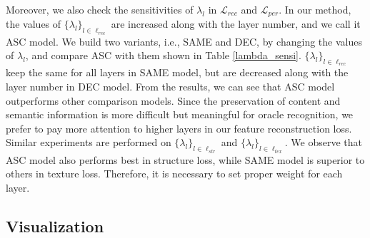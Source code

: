 \documentclass[10pt,journal,compsoc,twocolumn ]{IEEEtran}
\begin{document}
\begin{table}
\small
\renewcommand\arraystretch{1.1}
\caption{The empirical analysis results for the sensitivity of hyperparameter $\lambda_l$}
\label{lambda_sensi}
	\begin{center}
    \small
    \end{center}
\end{table}

Moreover, we also check the sensitivities of $\lambda_l$ in $\mathcal{L}_{rec}$ and $\mathcal{L}_{per}$. In our method, the values of $\{\lambda_l\}_{l\in \ell_{rec}}$ are increased along with the layer number, and we call it ASC model. We build two variants, i.e., SAME and DEC, by changing the values of $\lambda_l$, and compare ASC with them shown in Table \ref{lambda_sensi}. $\{\lambda_l\}_{l\in \ell_{rec}}$ keep the same for all layers in SAME model, but are decreased along with the layer number in DEC model. From the results, we can see that ASC model outperforms other comparison models. Since the preservation of content and semantic information is more difficult but meaningful for oracle recognition, we prefer to pay more attention to higher layers in our feature reconstruction loss. Similar experiments are performed on $\{\lambda_l\}_{l\in \ell_{str}}$ and $\{\lambda_l\}_{l\in \ell_{tex}}$. We observe that ASC model also performs best in structure loss, while SAME model is superior to others in texture loss. Therefore, it is necessary to set proper weight for each layer.

\subsection{Visualization}
\end{document}
